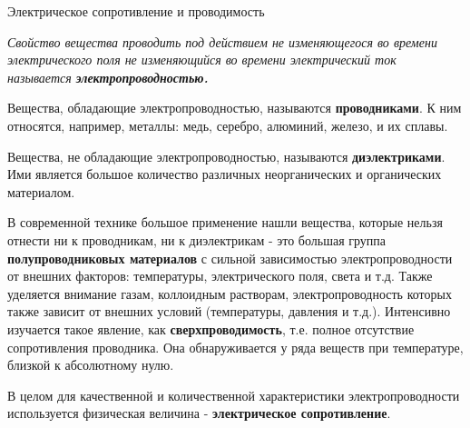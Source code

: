 \documentclass[12pt, pdf, hyperref={unicode},handout]{beamer}
\begin{document}
\begin{frame}{Электрическое сопротивление и проводимость}
  \begin{block}

    \small{
      \textit{Свойство вещества проводить под действием не изменяющегося во времени электрического поля не изменяющийся во времени электрический ток называется \textbf{электропроводностью.}}
      
      Вещества, обладающие электропроводностью, называются \textbf{проводниками}. К ним относятся, например, металлы: медь, серебро, алюминий, железо, и их сплавы.

      Вещества, не обладающие электропроводностью, называются \textbf{диэлектриками}. Ими является большое количество различных неорганических и органических материалом.

      В современной технике большое применение нашли вещества, которые нельзя отнести ни к проводникам, ни к диэлектрикам - это большая группа \textbf{полупроводниковых материалов} с сильной зависимостью электропроводности от внешних факторов: температуры, электрического поля, света и т.д. Также уделяется внимание газам, коллоидным растворам, электропроводность которых также зависит от внешних условий (температуры, давления и т.д.). Интенсивно изучается такое явление, как \textbf{сверхпроводимость}, т.е. полное отсутствие сопротивления проводника. Она обнаруживается у ряда веществ при температуре, близкой к абсолютному нулю.

      В целом для качественной и количественной характеристики электропроводности используется физическая величина - \textbf{электрическое сопротивление}.

}

  \end{block}
  
\end{frame}
\end{document}
